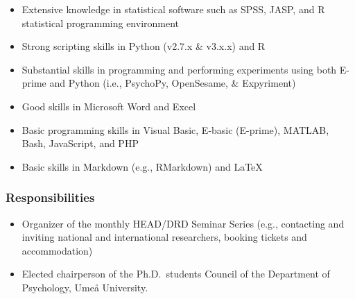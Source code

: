 \documentclass[]{article}
\providecommand{\tightlist}{%
  \setlength{\itemsep}{0pt}\setlength{\parskip}{0pt}}
\begin{document}
\begin{itemize}
\tightlist
\item
  Extensive knowledge in statistical software such as SPSS, JASP, and R
  statistical programming environment
\item
  Strong scripting skills in Python (v2.7.x \& v3.x.x) and R
\item
  Substantial skills in programming and performing experiments using
  both E-prime and Python (i.e., PsychoPy, OpenSesame, \& Expyriment)
\item
  Good skills in Microsoft Word and Excel
\item
  Basic programming skills in Visual Basic, E-basic (E-prime), MATLAB,
  Bash, JavaScript, and PHP
\item
  Basic skills in Markdown (e.g., RMarkdown) and \LaTeX
\end{itemize}

\subsubsection{Responsibilities}\label{responsibilities}

\begin{itemize}
\tightlist
\item
  Organizer of the monthly HEAD/DRD Seminar Series (e.g., contacting and
  inviting national and international researchers, booking tickets and
  accommodation)
\item
  Elected chairperson of the Ph.D.~students Council of the Department of
  Psychology, Umeå University.
\end{itemize}

\newpage
\pagestyle{empty}
\end{document}
